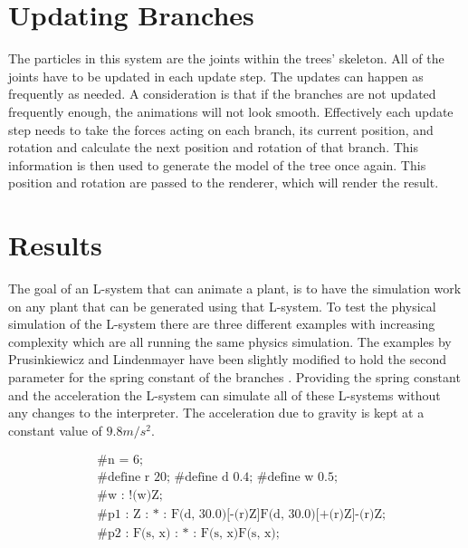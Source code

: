 \section{Updating Branches}

The particles in this system are the joints within the trees' skeleton. All of the joints have to be updated in each update step. The updates can happen as frequently as needed. A consideration is that if the branches are not updated frequently enough, the animations will not look smooth. Effectively each update step needs to take the forces acting on each branch, its current position, and rotation and calculate the next position and rotation of that branch. This information is then used to generate the model of the tree once again. This position and rotation are passed to the renderer, which will render the result.

\section{Results}

The goal of an L-system that can animate a plant, is to have the simulation work on any plant that can be generated using that L-system. To test the physical simulation of the L-system there are three different examples with increasing complexity which are all running the same physics simulation. The examples by Prusinkiewicz and Lindenmayer have been slightly modified to hold the second parameter for the spring constant of the branches \cite{prusinkiewicz2012algorithmic}. Providing the spring constant and the acceleration the L-system can simulate all of these L-systems without any changes to the interpreter. The acceleration due to gravity is kept at a constant value of $9.8m/s^2$.

\begin{singlespace}
\begin{equation}
\begin{aligned}
	&\textrm{\#n = 6;} \\
	&\textrm{\#define r 20; \#define d 0.4; \#define w 0.5;}\\
	&\textrm{\#w : !(w)Z;}\\
	&\textrm{\#p1 : Z : * : F(d, 30.0)[-(r)Z]F(d, 30.0)[+(r)Z]-(r)Z;}\\
	&\textrm{\#p2 : F(s, x) : * : F(s, x)F(s, x);}
\end{aligned}
\end{equation}
\end{singlespace}


